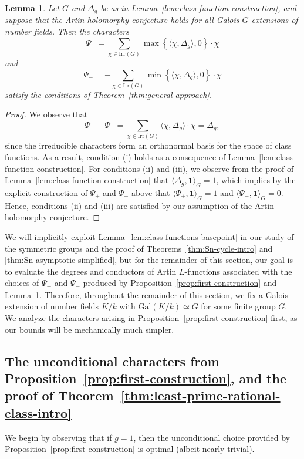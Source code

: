 \documentclass[12pt]{amsart}
\newtheorem{lemma}[theorem]{Lemma}
\theoremstyle{definition} \newtheorem{definition}[theorem]{Definition}
\theoremstyle{example} \newtheorem{example}[theorem]{Example}
\theoremstyle{remark} \newtheorem{remark}{Remark}[theorem]
\numberwithin{equation}{section}
\numberwithin{theorem}{section}
\begin{document}
	\begin{lemma} \label{lem:class-functions-artin}
		Let $G$ and $\Delta_g$ be as in Lemma~\ref{lem:class-function-construction}, and suppose that the Artin holomorphy conjecture holds for all Galois $G$-extensions of number fields.  Then the characters
			\[
				\Psi_+ = \sum_{\chi \in \mathrm{Irr}(G)} \max\left\{ \langle \chi, \Delta_g \rangle, 0 \right\} \cdot \chi
			\]
		and
			\[
				\Psi_- = - \sum_{\chi \in \mathrm{Irr}(G)} \min\left\{ \langle \chi, \Delta_g \rangle, 0 \right\} \cdot \chi
			\]
		satisfy the conditions of Theorem~\ref{thm:general-approach}.
	\end{lemma}
	\begin{proof}
		We observe that
			\[
				\Psi_+ - \Psi_-
					= \sum_{\chi \in \mathrm{Irr}(G)} \langle \chi, \Delta_g \rangle \cdot \chi
					= \Delta_g,
			\]
		since the irreducible characters form an orthonormal basis for the space of class functions.  As a result, condition (i) holds as a consequence of Lemma~\ref{lem:class-function-construction}.  For conditions (ii) and (iii), we observe from the proof of Lemma~\ref{lem:class-function-construction} that $\langle \Delta_g, \mathbf{1} \rangle_G = 1$, which implies by the explicit construction of $\Psi_+$ and $\Psi_-$ above that $\langle \Psi_+, \mathbf{1} \rangle_G = 1$ and $\langle \Psi_-, \mathbf{1} \rangle_G = 0$.  Hence, conditions (ii) and (iii) are satisfied by our assumption of the Artin holomorphy conjecture.
	\end{proof}

	We will implicitly exploit Lemma~\ref{lem:class-functions-basepoint} in our study of the symmetric groups and the proof of Theorems~\ref{thm:Sn-cycle-intro} and \ref{thm:Sn-asymptotic-simplified}, but for the remainder of this section, our goal is to evaluate the degrees and conductors of Artin $L$-functions associated with the choices of $\Psi_+$ and $\Psi_-$ produced by Proposition~\ref{prop:first-construction} and Lemma~\ref{lem:class-functions-artin}.
	Therefore, throughout the remainder of this section, we fix a Galois extension of number fields $K/k$ with $\mathrm{Gal}(K/k) \simeq G$ for some finite group $G$.  We analyze the characters arising in Proposition~\ref{prop:first-construction} first, as our bounds will be mechanically much simpler.
	
\subsection{The unconditional characters from Proposition~\ref{prop:first-construction}, and the proof of Theorem~\ref{thm:least-prime-rational-class-intro}}
	We begin by observing that if $g = 1$, then the unconditional choice provided by Proposition~\ref{prop:first-construction} is optimal (albeit nearly trivial).
	
\end{document}
